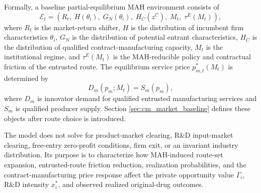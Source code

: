 \documentclass[12pt]{article}
\newcommand{\1}{\mathbf{1}}
\begin{document}
Formally, a baseline partial-equilibrium MAH environment consists of
\begin{equation}
    \mathcal E_t =
    \left(
    R_t,\; H(\theta_i),\; G_N(\theta_i),\; H_C(z^C),\; M_t,\; \tau^E(M_t)
    \right),
    \label{eq:pe_environment}
\end{equation}
where $R_t$ is the market-return shifter, $H$ is the distribution of incumbent firm characteristics $\theta_i$, $G_N$ is the distribution of potential entrant characteristics, $H_C$ is the distribution of qualified contract-manufacturing capacity, $M_t$ is the institutional regime, and $\tau^E(M_t)$ is the MAH-reducible policy and contractual friction of the entrusted route. The equilibrium service price $p_{m,t}^*(M_t)$ is determined by
\begin{equation}
    D_m(p_m;M_t)=S_m(p_m),
    \label{eq:baseline_cm_clearing}
\end{equation}
where $D_m$ is innovator demand for qualified entrusted manufacturing services and $S_m$ is qualified producer supply. Section \ref{sec:cm_market_baseline} defines these objects after route choice is introduced.

The model does not solve for product-market clearing, R\&D input-market clearing, free-entry zero-profit conditions, firm exit, or an invariant industry distribution. Its purpose is to characterize how MAH-induced route-set expansion, entrusted-route friction reduction, realization probabilities, and the contract-manufacturing price response affect the private opportunity value $\Gamma_i$, R\&D intensity $x_i^*$, and observed realized original-drug outcomes.
\end{document}
